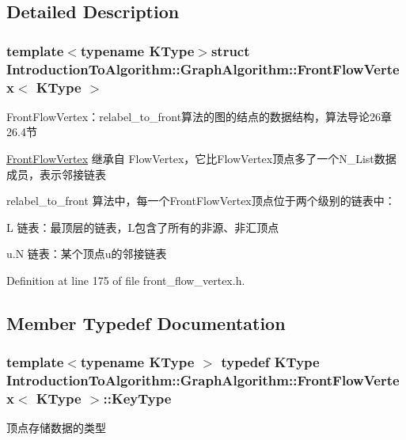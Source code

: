 \subsection{Detailed Description}
\subsubsection*{template$<$typename K\+Type$>$struct Introduction\+To\+Algorithm\+::\+Graph\+Algorithm\+::\+Front\+Flow\+Vertex$<$ K\+Type $>$}

Front\+Flow\+Vertex：relabel\+\_\+to\+\_\+front算法的图的结点的数据结构，算法导论26章26.4节 

\hyperlink{struct_introduction_to_algorithm_1_1_graph_algorithm_1_1_front_flow_vertex}{Front\+Flow\+Vertex} 继承自 Flow\+Vertex，它比\+Flow\+Vertex顶点多了一个{\ttfamily N\+\_\+\+List}数据成员，表示邻接链表

relabel\+\_\+to\+\_\+front 算法中，每一个\+Front\+Flow\+Vertex顶点位于两个级别的链表中：


\begin{DoxyItemize}
\item L 链表：最顶层的链表，\+L包含了所有的非源、非汇顶点
\item u.\+N 链表：某个顶点u的邻接链表 
\end{DoxyItemize}

Definition at line 175 of file front\+\_\+flow\+\_\+vertex.\+h.



\subsection{Member Typedef Documentation}
\hypertarget{struct_introduction_to_algorithm_1_1_graph_algorithm_1_1_front_flow_vertex_a76ed9e9d0c0da5c60c4a004eeda192ad}{}
\subsubsection[{Key\+Type}]{\setlength{\rightskip}{0pt plus 5cm}template$<$typename K\+Type $>$ typedef K\+Type {\bf Introduction\+To\+Algorithm\+::\+Graph\+Algorithm\+::\+Front\+Flow\+Vertex}$<$ K\+Type $>$\+::{\bf Key\+Type}}\label{struct_introduction_to_algorithm_1_1_graph_algorithm_1_1_front_flow_vertex_a76ed9e9d0c0da5c60c4a004eeda192ad}
顶点存储数据的类型 

